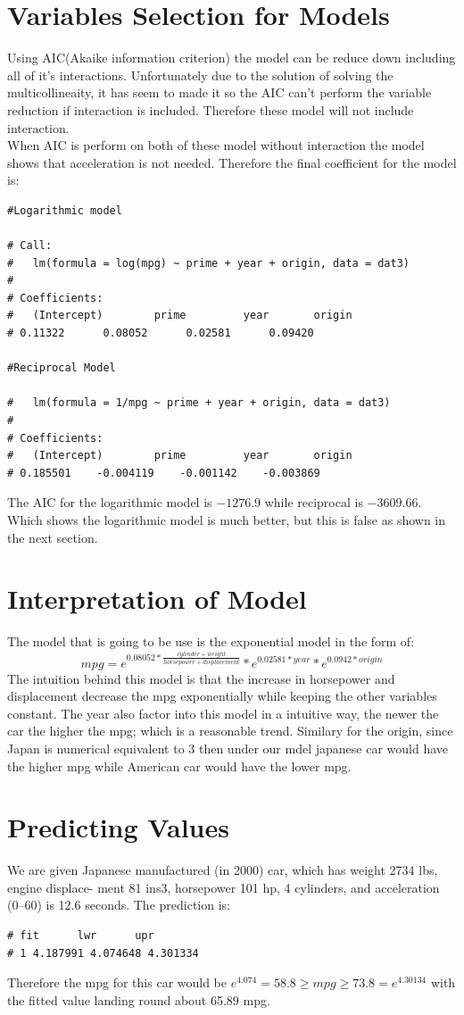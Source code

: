 \documentclass[11pt]{article} %
\begin{document}
\section{Variables Selection for Models}
Using AIC(Akaike information criterion) the model can be reduce down including all of it's interactions. Unfortunately due to the solution of solving the multicollineaity, it has seem to made it so the AIC can't perform the variable reduction if interaction is included. Therefore these model will not include interaction.\\
When AIC is perform on both of these model without interaction the model shows that acceleration is not needed. Therefore the final coefficient for the model is:
\begin{lstlisting}
#Logarithmic model

# Call:
#   lm(formula = log(mpg) ~ prime + year + origin, data = dat3)
# 
# Coefficients:
#   (Intercept)        prime         year       origin  
# 0.11322      0.08052      0.02581      0.09420  

#Reciprocal Model

#   lm(formula = 1/mpg ~ prime + year + origin, data = dat3)
# 
# Coefficients:
#   (Intercept)        prime         year       origin  
# 0.185501    -0.004119    -0.001142    -0.003869  
\end{lstlisting}
The AIC for the logarithmic model is $-1276.9$ while reciprocal is $-3609.66$. Which shows the logarithmic model is much better, but this is false as shown in the next section.


\section{Interpretation of Model}
The model that is going to be use is the exponential model in the form of:
$$
mpg = e^{0.08052*\frac{cylinder+weight}{horsepower + displacement}}*e^{0.02581*year}*e^{0.0942*origin}
$$
The intuition behind this model is that the increase in horsepower and displacement decrease the mpg exponentially while keeping the other variables constant. The year also factor into this model in a intuitive way, the newer the car the higher the mpg; which is a reasonable trend. Similary for the origin, since Japan is numerical equivalent to 3 then under our mdel japanese car would have the higher mpg while American car would have the lower mpg.
\section{Predicting Values}
We are given Japanese manufactured (in 2000) car, which has weight 2734 lbs, engine displace- ment 81 ins3, horsepower 101 hp, 4 cylinders, and acceleration (0–60) is 12.6 seconds. The prediction is:
\begin{lstlisting}
# fit      lwr      upr
# 1 4.187991 4.074648 4.301334
\end{lstlisting}
Therefore the mpg for this car would be $e^{4.074}=58.8\geq mpg\geq 73.8 = e^{4.30134}$ with the fitted value landing round about 65.89 mpg.
\end{document}
